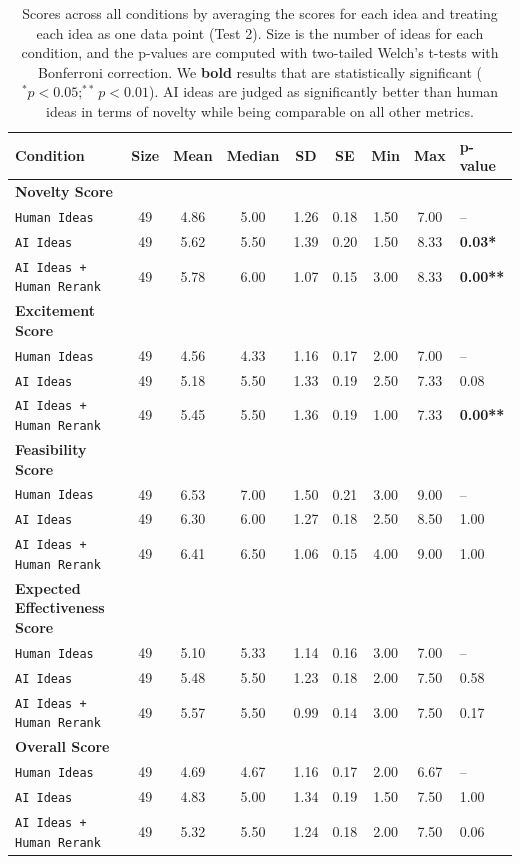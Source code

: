 \begin{table}[t]
\centering
\begin{tabular}{l c c c c c c c l} 
 \hline
 Condition & Size & Mean & Median & SD & SE & Min & Max & p-value \\ 
 \hline 
 \textbf{Novelty Score}  \\
 \texttt{Human Ideas} & 49 & 4.86 & 5.00 & 1.26 & 0.18 & 1.50 & 7.00 & -- \\
 \texttt{AI Ideas} & 49 & 5.62 & 5.50 & 1.39 & 0.20 & 1.50 & 8.33 & \textbf{0.03*} \\
 \texttt{AI Ideas + Human Rerank} & 49 & 5.78 & 6.00 & 1.07 & 0.15 & 3.00 & 8.33 & \textbf{0.00**} \\
\hline 
\textbf{Excitement Score} \\ 
 \texttt{Human Ideas} & 49 & 4.56 & 4.33 & 1.16 & 0.17 & 2.00 & 7.00 & -- \\
 \texttt{AI Ideas} & 49 & 5.18 & 5.50 & 1.33 & 0.19 & 2.50 & 7.33 & 0.08 \\
 \texttt{AI Ideas + Human Rerank} & 49 & 5.45 & 5.50 & 1.36 & 0.19 & 1.00 & 7.33 & \textbf{0.00**} \\
\hline 
\textbf{Feasibility Score} \\ 
 \texttt{Human Ideas} & 49 & 6.53 & 7.00 & 1.50 & 0.21 & 3.00 & 9.00 & -- \\
 \texttt{AI Ideas} & 49 & 6.30 & 6.00 & 1.27 & 0.18 & 2.50 & 8.50 & 1.00 \\
 \texttt{AI Ideas + Human Rerank} & 49 & 6.41 & 6.50 & 1.06 & 0.15 & 4.00 & 9.00 & 1.00 \\
\hline 
\textbf{Expected Effectiveness Score} \\
 \texttt{Human Ideas} & 49 & 5.10 & 5.33 & 1.14 & 0.16 & 3.00 & 7.00 & -- \\
 \texttt{AI Ideas} & 49 & 5.48 & 5.50 & 1.23 & 0.18 & 2.00 & 7.50 & 0.58 \\
 \texttt{AI Ideas + Human Rerank} & 49 & 5.57 & 5.50 & 0.99 & 0.14 & 3.00 & 7.50 & 0.17 \\
  \hline
 \textbf{Overall Score} \\
 \texttt{Human Ideas} & 49 & 4.69 & 4.67 & 1.16 & 0.17 & 2.00 & 6.67 & -- \\
 \texttt{AI Ideas} & 49 & 4.83 & 5.00 & 1.34 & 0.19 & 1.50 & 7.50 & 1.00 \\
 \texttt{AI Ideas + Human Rerank} & 49 & 5.32 & 5.50 & 1.24 & 0.18 & 2.00 & 7.50 & 0.06 \\ 
 \hline
\end{tabular}
\caption{ Scores across all conditions by averaging the scores for each idea and treating each idea as one data point (Test 2). Size is the number of ideas for each condition, and the p-values are computed with two-tailed Welch's t-tests with Bonferroni correction. We \textbf{bold} results that are statistically significant ($^*p<0.05; ^{**}p<0.01$). AI ideas are judged as significantly better than human ideas in terms of novelty while being comparable on all other metrics.}
\label{table:results_per_idea}
\end{table}




